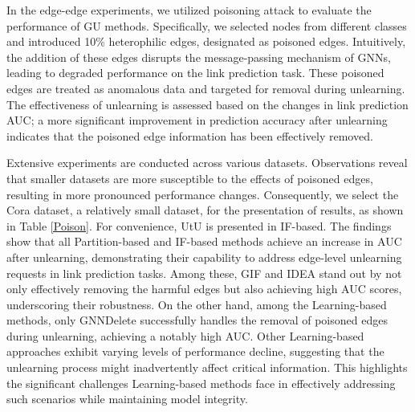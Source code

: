 




In the edge-edge experiments, we utilized poisoning attack to evaluate the performance of GU methods. Specifically, we selected nodes from different classes and introduced 10\% heterophilic edges, designated as poisoned edges. Intuitively, the addition of these edges disrupts the message-passing mechanism of GNNs, leading to degraded performance on the link prediction task. These poisoned edges are treated as anomalous data and targeted for removal during unlearning. The effectiveness of unlearning is assessed based on the changes in link prediction AUC; a more significant improvement in prediction accuracy after unlearning indicates that the poisoned edge information has been effectively removed.



Extensive experiments are conducted across various datasets. Observations reveal that smaller datasets are more susceptible to the effects of poisoned edges, resulting in more pronounced performance changes. Consequently, we select the Cora dataset, a relatively small dataset, for the presentation of results, as shown in Table \ref{Poison}. For convenience, UtU is presented in IF-based. The findings show that all Partition-based and IF-based methods achieve an increase in AUC after unlearning, demonstrating their capability to address edge-level unlearning requests in link prediction tasks. Among these, GIF and IDEA stand out by not only effectively removing the harmful edges but also achieving high AUC scores, underscoring their robustness. On the other hand, among the Learning-based methods, only GNNDelete successfully handles the removal of poisoned edges during unlearning, achieving a notably high AUC. Other Learning-based approaches exhibit varying levels of performance decline, suggesting that the unlearning process might inadvertently affect critical information. This highlights the significant challenges Learning-based methods face in effectively addressing such scenarios while maintaining model integrity.


